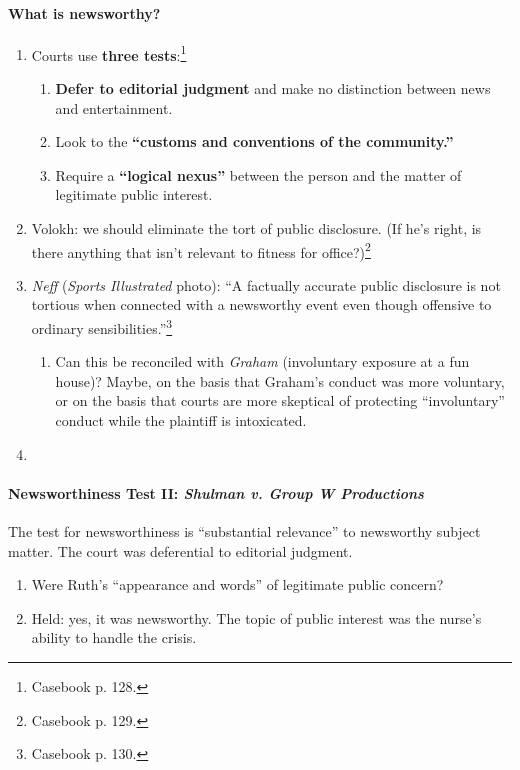\paragraph{What is newsworthy?}

\begin{enumerate}
    \item Courts use \textbf{three tests}:\footnote{Casebook p. 128.}
    \begin{enumerate}
        \item \textbf{Defer to editorial judgment} and make no distinction 
        between news and entertainment.
        \item Look to the \textbf{``customs and conventions of the community.''}
        \item Require a \textbf{``logical nexus''} between the person and the 
        matter of legitimate public interest.
    \end{enumerate}
    \item Volokh: we should eliminate the tort of public disclosure. (If he's 
    right, is there anything that isn't relevant to fitness for 
    office?)\footnote{Casebook p. 129.}
    \item \emph{Neff} (\emph{Sports Illustrated} photo): ``A factually accurate 
    public disclosure is not tortious when connected with a newsworthy event 
    even though offensive to ordinary sensibilities.''\footnote{Casebook p. 
    130.}
    \begin{enumerate}
        \item Can this be reconciled with \emph{Graham} (involuntary exposure at 
        a fun house)? Maybe, on the basis that Graham's conduct was more 
        voluntary, or on the basis that courts are more skeptical of protecting
        ``involuntary'' conduct while the plaintiff is intoxicated.
    \end{enumerate}
    \item
\end{enumerate}

\paragraph{Newsworthiness Test II: \emph{Shulman v. Group W Productions}}

The test for newsworthiness is ``substantial relevance'' to newsworthy subject 
matter. The court was deferential to editorial judgment.

\begin{enumerate}
    \item Were Ruth's ``appearance and words'' of legitimate public concern?
    \item Held: yes, it was newsworthy. The topic of public interest was the 
    nurse's ability to handle the crisis.
\end{enumerate}

